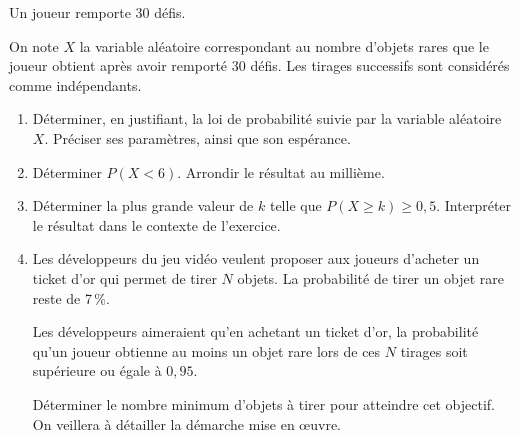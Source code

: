 \documentclass[10pt]{article}
\begin{document}
\medskip

Un joueur remporte $30$ défis.

On note $X$ la variable aléatoire correspondant au nombre d'objets rares que le joueur obtient après avoir remporté $30$ défis. Les tirages successifs sont considérés comme indépendants.

\medskip

\begin{enumerate}
\item Déterminer, en justifiant, la loi de probabilité suivie par la variable aléatoire $X$. Préciser ses paramètres, ainsi que son espérance.
\item Déterminer $P(X < 6)$. Arrondir le résultat au millième.
\item Déterminer la plus grande valeur de $k$ telle que $P(X \geqslant k) \geqslant 0,5$. Interpréter le résultat dans le contexte de l'exercice.
\item Les développeurs du jeu vidéo veulent proposer aux joueurs d'acheter un \og ticket
d'or \fg{} qui permet de tirer $N$ objets. La probabilité de tirer un objet rare reste de 7\,\%.

Les développeurs aimeraient qu'en achetant un ticket d'or, la probabilité qu'un joueur obtienne au moins un objet rare lors de ces $N$ tirages soit supérieure ou égale à $0,95$.

Déterminer le nombre minimum d'objets à tirer pour atteindre cet objectif. On veillera à détailler la démarche mise en œuvre.
\end{enumerate}
\end{document}
